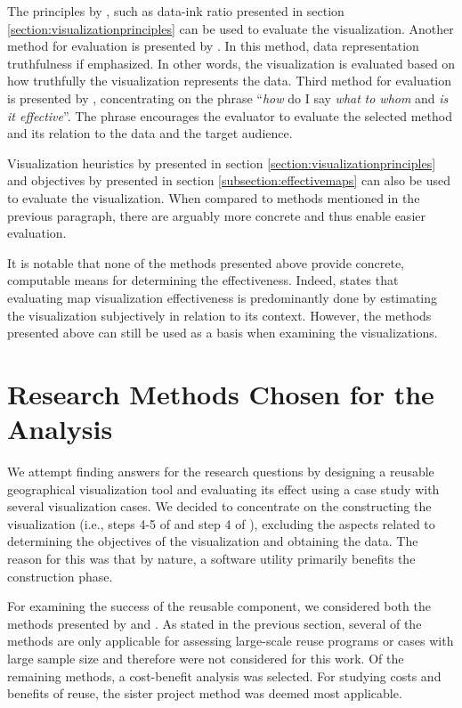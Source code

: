 The principles by \citet{tufte_visual_1986}, such as data-ink ratio presented in section \ref{section:visualizationprinciples} can be used to evaluate the visualization. Another method for evaluation is presented by \citet{azzam_j-b_2013}. In this method, data representation truthfulness if emphasized. In other words, the visualization is evaluated based on how truthfully the visualization represents the data. Third method for evaluation is presented by \citet{kraak_cartographic_1998}, concentrating on the phrase ``\emph{how} do I say \emph{what} \emph{to whom} and \emph{is it effective}''. The phrase encourages the evaluator to evaluate the selected method and its relation to the data and the target audience.

Visualization heuristics by \citet{zuk_heuristics_2006} presented in section \ref{section:visualizationprinciples} and objectives by \citet{schlichtmann_visualization_2002} presented in section \ref{subsection:effectivemaps} can also be used to evaluate the visualization. When compared to methods mentioned in the previous paragraph, there are arguably more concrete and thus enable easier evaluation.

It is notable that none of the methods presented above provide concrete, computable means for determining the effectiveness. Indeed, \citet{kraak_cartographic_1998} states that evaluating map visualization effectiveness is predominantly done by estimating the visualization subjectively in relation to its context. However, the methods presented above can still be used as a basis when examining the visualizations.

\section{Research Methods Chosen for the Analysis}

We attempt finding answers for the research questions by designing a reusable geographical visualization tool and evaluating its effect using a case study with several visualization cases. We decided to concentrate on the constructing the visualization (i.e., steps 4-5 of \citet{schlichtmann_visualization_2002} and step 4 of \citet{slocum_thematic_2014}), excluding the aspects related to determining the objectives of the visualization and obtaining the data. The reason for this was that by nature, a software utility primarily benefits the construction phase.

For examining the success of the reusable component, we considered both the methods presented by \citet{frakes_software_1996} and \citet{mohagheghi_quality_2007}. As stated in the previous section, several of the methods are only applicable for assessing large-scale reuse programs or cases with large sample size and therefore were not considered for this work. Of the remaining methods, a cost-benefit analysis was selected. For studying costs and benefits of reuse, the sister project method was deemed most applicable. 

